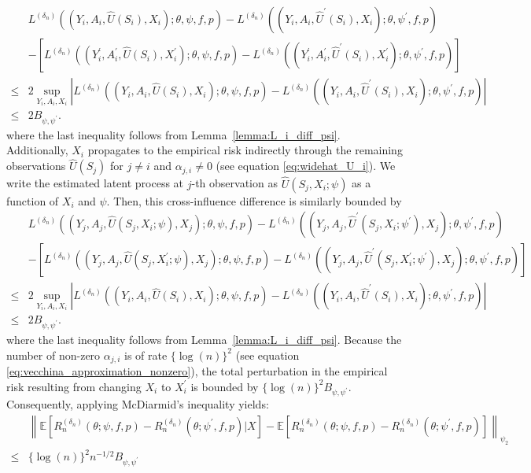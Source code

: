 \documentclass[12pt]{article}
\newcommand{\E}{\mathbb{E}}
\begin{document}
\begin{align*}
    &L^{(\delta_n)}((Y_i,A_i,\widehat U(S_i),X_i);\theta,\psi,f,p) - L^{(\delta_n)}((Y_i,A_i,\widehat U^\prime(S_i),X_i);\theta,\psi^\prime,f,p)\\
    & - \left[L^{(\delta_n)}((Y_i^\prime,A_i^\prime,\widehat U(S_i),X_i^\prime);\theta,\psi,f,p) - L^{(\delta_n)}((Y_i^\prime,A_i^\prime,\widehat U^\prime(S_i),X_i^\prime);\theta,\psi^\prime,f,p) \right]\\
    \leq & 2 \sup_{Y_i,A_i,X_i}\left|L^{(\delta_n)}((Y_i,A_i,\widehat U(S_i),X_i);\theta,\psi,f,p) - L^{(\delta_n)}((Y_i,A_i,\widehat U^\prime(S_i),X_i);\theta,\psi^\prime,f,p)\right|\\
    \leq & 2B_{\psi,\psi^\prime}.
\end{align*}
where the last inequality follows from Lemma~\ref{lemma:L_i_diff_psi}. Additionally, $X_i$ propagates to the empirical risk indirectly through the remaining observations $\widehat U(S_j)$ for $j\neq i$ and $\alpha_{j,i}\neq 0$ (see equation \eqref{eq:widehat_U_i}). We write the estimated latent process at $j$-th observation as $\widehat U(S_j,X_i;\psi)$ as a function of $X_i$ and $\psi$. Then, this cross-influence difference is similarly bounded by
\begin{align*}
    &L^{(\delta_n)}((Y_j,A_j,\widehat U(S_j,X_i;\psi),X_j);\theta,\psi,f,p) - L^{(\delta_n)}((Y_j,A_j,\widehat U^\prime(S_j,X_i;\psi^\prime),X_j);\theta,\psi^\prime,f,p)\\
    & - \left[L^{(\delta_n)}((Y_j,A_j,\widehat U(S_j,X_i^\prime;\psi),X_j);\theta,\psi,f,p) - L^{(\delta_n)}((Y_j,A_j,\widehat U^\prime(S_j,X_i^\prime;\psi^\prime),X_j);\theta,\psi^\prime,f,p) \right]\\
    \leq & 2 \sup_{Y_i,A_i,X_i}\left|L^{(\delta_n)}((Y_i,A_i,\widehat U(S_i),X_i);\theta,\psi,f,p) - L^{(\delta_n)}((Y_i,A_i,\widehat U^\prime(S_i),X_i);\theta,\psi^\prime,f,p)\right|\\
    \leq & 2B_{\psi,\psi^\prime}.
\end{align*}
where the last inequality follows from Lemma~\ref{lemma:L_i_diff_psi}. Because the number of non-zero $\alpha_{j,i}$ is of rate $\{\log(n)\}^2$ (see equation \eqref{eq:vecchina_approximation_nonzero}), the total perturbation in the empirical risk resulting from changing $X_i$ to $X_i^\prime$ is bounded by $\{\log(n)\}^2 B_{\psi,\psi^\prime}$. Consequently, applying McDiarmid's inequality yields:
\begin{align*}
    &\left\|\E\left[R_n^{(\delta_n)}(\theta;\psi,f,p)-R_n^{({\delta_n})}(\theta;\psi^\prime,f,p)|X\right]-\E\left[R_n^{(\delta_n)}(\theta;\psi,f,p)-R_n^{({\delta_n})}(\theta;\psi^\prime,f,p)\right]\right\|_{\psi_2}\\
    \leq &\{\log(n)\}^2 n^{-1/2}B_{\psi,\psi^\prime}
\end{align*}
\end{document}
